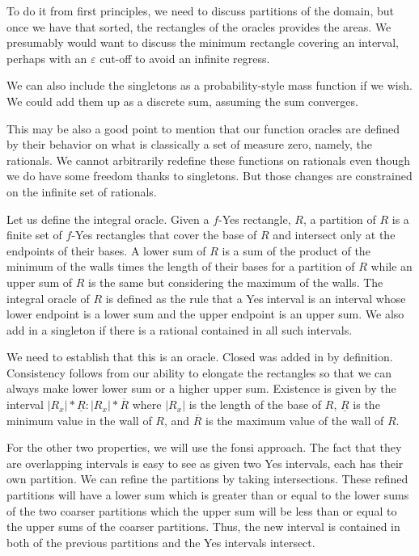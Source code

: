 \documentclass[12pt]{article}
\theoremstyle{remark}
\begin{document}
To do it from first principles, we need to discuss partitions of the domain, but once we have that sorted, the rectangles of the oracles provides the areas. We presumably would want to discuss the minimum rectangle covering an interval, perhaps with an $\varepsilon$ cut-off to avoid an infinite regress. 

We can also include the singletons as a probability-style mass function if we wish. We could add them up as a discrete sum, assuming the sum converges. 

This may be also a good point to mention that our function oracles are defined by their behavior on what is classically a set of measure zero, namely, the rationals. We cannot arbitrarily redefine these functions on rationals even though we do have some freedom thanks to singletons. But those changes are constrained on the infinite set of rationals. 

Let us define the integral oracle. Given a $f$-Yes rectangle, $R$, a partition of $R$ is a finite set of $f$-Yes rectangles that cover the base of $R$ and intersect only at the endpoints of their bases. A lower sum of $R$ is a sum of the product of the minimum of the walls times the length of their bases for a partition of $R$ while an upper sum of $R$ is the same but considering the maximum of the walls. The integral oracle of $R$ is defined as the rule that a Yes interval is an interval whose lower endpoint is a lower sum and the upper endpoint is an upper sum. We also add in a singleton if there is a rational contained in all such intervals. 

We need to establish that this is an oracle. Closed was added in by definition. Consistency follows from our ability to elongate the rectangles so that we can always make lower lower sum or a higher upper sum. Existence is given by the interval $|R_x|*\underline{R}: |R_x|*\overline{R}$ where $|R_x|$ is the length of the base of $R$, $\underline{R}$ is the minimum value in the wall of $R$, and $\overline{R}$ is the maximum value of the wall of $R$. 

For the other two properties, we will use the fonsi approach. The fact that they are overlapping intervals is easy to see as given two Yes intervals, each has their own partition. We can refine the partitions by taking intersections. These refined partitions will have a lower sum which is greater than or equal to the lower sums of the two coarser partitions which the upper sum will be less than or equal to the upper sums of the coarser partitions. Thus, the new interval is contained in both of the previous partitions and the Yes intervals intersect. 
\end{document}
